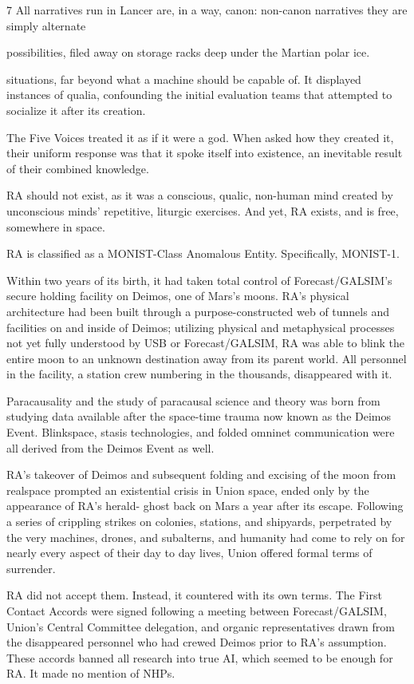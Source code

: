 7 All narratives run in Lancer are, in a way, canon: non-canon narratives they are simply alternate

possibilities, filed away on storage racks deep under the Martian polar ice.




situations, far beyond what a machine should be capable of. It displayed instances of qualia,
confounding the initial evaluation teams that attempted to socialize it after its creation.


The Five Voices treated it as if it were a god. When asked how they created it, their uniform
response was that it spoke itself into existence, an inevitable result of their combined knowledge.


RA should not exist, as it was a conscious, qualic, non-human mind created by unconscious
minds’ repetitive, liturgic exercises. And yet, RA exists, and is free, somewhere in space.


RA is classified as a MONIST-Class Anomalous Entity. Specifically, MONIST-1.


Within two years of its birth, it had taken total control of Forecast/GALSIM’s secure holding
facility on Deimos, one of Mars’s moons. RA’s physical architecture had been built through a
purpose-constructed web of tunnels and facilities on and inside of Deimos; utilizing physical and
metaphysical processes not yet fully understood by USB or Forecast/GALSIM, RA was able to
blink the entire moon to an unknown destination away from its parent world. All personnel in the
facility, a station crew numbering in the thousands, disappeared with it.


Paracausality and the study of paracausal science and theory was born from studying data
available after the space-time trauma now known as the Deimos Event. Blinkspace, stasis
technologies, and folded omninet communication were all derived from the Deimos Event as
well.


RA’s takeover of Deimos and subsequent folding and excising of the moon from realspace
prompted an existential crisis in Union space, ended only by the appearance of RA’s herald-
ghost back on Mars a year after its escape. Following a series of crippling strikes on colonies,
stations, and shipyards, perpetrated by the very machines, drones, and subalterns, and humanity
had come to rely on for nearly every aspect of their day to day lives, Union offered formal terms
of surrender.


RA did not accept them. Instead, it countered with its own terms. The First Contact Accords
were signed following a meeting between Forecast/GALSIM, Union’s Central Committee
delegation, and organic representatives drawn from the disappeared personnel who had crewed
Deimos prior to RA’s assumption. These accords banned all research into true AI, which seemed
to be enough for RA. It made no mention of NHPs.


